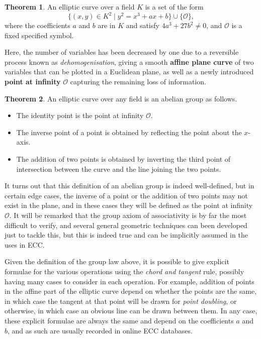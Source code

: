\documentclass{article}
\theoremstyle{definition}
\newtheorem{theorem}{Theorem}
\renewcommand{\O}{\mathcal{O}}
\begin{document}
\begin{theorem}
An elliptic curve over a field $ K $ is a set of the form
$$ \{ (x, y) \in K^2 \mid y^2 = x^3 + ax + b \} \cup \{ \O \}, $$
where the coefficients $ a $ and $ b $ are in $ K $ and satisfy $ 4a^3 + 27b^2 \ne 0 $, and $ \O $ is a fixed specified symbol.
\end{theorem}

Here, the number of variables has been decreased by one due to a reversible process known as \emph{dehomogenisation}, giving a smooth \textbf{affine plane curve} of two variables that can be plotted in a Euclidean plane, as well as a newly introduced \textbf{point at infinity} $ \O $ capturing the remaining loss of information.

\begin{theorem}
An elliptic curve over any field is an abelian group as follows.
\begin{itemize}
\item The identity point is the point at infinity $ \O $.
\item The inverse point of a point is obtained by reflecting the point about the $ x $-axis.
\item The addition of two points is obtained by inverting the third point of intersection between the curve and the line joining the two points.
\end{itemize}
\end{theorem}

It turns out that this definition of an abelian group is indeed well-defined, but in certain edge cases, the inverse of a point or the addition of two points may not exist in the plane, and in these cases they will be defined as the point at infinity $ \O $. It will be remarked that the group axiom of associativity is by far the most difficult to verify, and several general geometric techniques can been developed just to tackle this, but this is indeed true and can be implicitly assumed in the uses in ECC.

Given the definition of the group law above, it is possible to give explicit formulae for the various operations using the \emph{chord and tangent} rule, possibly having many cases to consider in each operation. For example, addition of points in the affine part of the elliptic curve depend on whether the points are the same, in which case the tangent at that point will be drawn for \emph{point doubling}, or otherwise, in which case an obvious line can be drawn between them. In any case, these explicit formulae are always the same and depend on the coefficients $ a $ and $ b $, and as such are usually recorded in online ECC databases.
\end{document}
